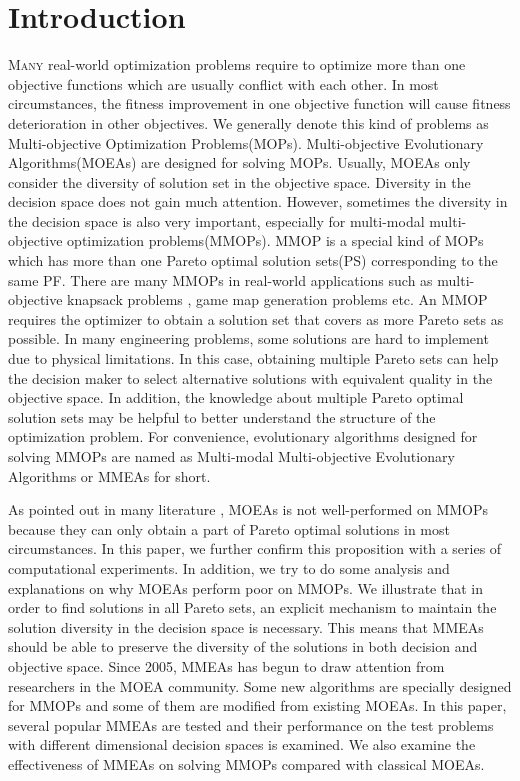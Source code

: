 \documentclass[conference]{IEEEtran}
\begin{document}
\section{Introduction}
\lettrine[lines=2]{M}{any} real-world optimization problems require to optimize more than one objective functions which are usually conflict with each other. In most circumstances, the fitness improvement in one objective function will cause fitness deterioration in other objectives. We generally denote this kind of problems as Multi-objective Optimization Problems(MOPs). Multi-objective Evolutionary Algorithms(MOEAs) are designed for solving MOPs. Usually, MOEAs only consider the diversity of solution set in the objective space. Diversity in the decision space does not gain much attention. However, sometimes the diversity in the decision space is also very important, especially for multi-modal multi-objective optimization problems(MMOPs). MMOP is a special kind of MOPs which has more than one Pareto optimal solution sets(PS) corresponding to the same PF. There are many MMOPs in real-world applications such as multi-objective knapsack problems \cite{Jaszkiewicz2002}, game map generation problems \cite{Togelius} etc. An MMOP requires the optimizer to obtain a solution set that covers as more Pareto sets as possible. In many engineering problems, some solutions are hard to implement due to physical limitations. In this case, obtaining multiple Pareto sets can help the decision maker to select alternative solutions with equivalent quality in the objective space. In addition, the knowledge about multiple Pareto optimal solution sets may be helpful to better understand the structure of the optimization problem\cite{Deb2001}. For convenience, evolutionary algorithms designed for solving MMOPs are named as Multi-modal Multi-objective Evolutionary Algorithms or MMEAs for short.

As pointed out in many literature\cite{Tanabe2019} \cite{Liang2016}, MOEAs is not well-performed on MMOPs because they can only obtain a part of Pareto optimal solutions in most circumstances. In this paper, we further confirm this proposition with a series of computational experiments. In addition, we try to do some analysis and explanations on why MOEAs perform poor on MMOPs. We illustrate that in order to find solutions in all Pareto sets, an explicit mechanism to maintain the solution diversity in the decision space is necessary. This means that MMEAs should be able to preserve the diversity of the solutions in both decision and objective space. Since 2005, MMEAs has begun to draw attention from researchers in the MOEA community. Some new algorithms are specially designed for MMOPs and some of them are modified from existing MOEAs. In this paper, several popular MMEAs are tested and their performance on the test problems with different dimensional decision spaces is examined. We also examine the effectiveness of MMEAs on solving MMOPs compared with classical MOEAs.
\end{document}

